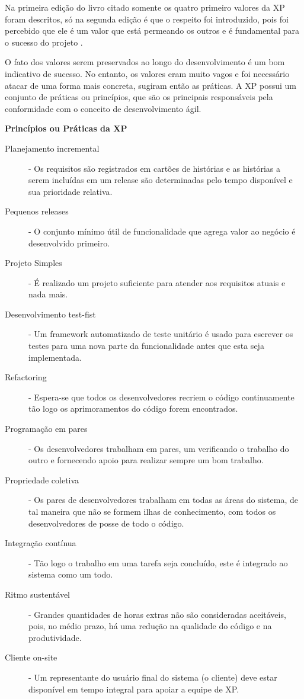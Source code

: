 \documentclass[
	article,			%
	11pt,				%
	oneside,			%
	a4paper,			%
	english,			%
	brazil,				%
	sumario=tradicional
	]{abntex2}
\begin{document}
Na primeira edição do livro citado somente os quatro primeiro valores da XP
foram descritos, só na segunda edição é que o respeito foi introduzido, pois foi
percebido que ele é um valor que está permeando os outros e é fundamental para
o sucesso do projeto \cite{beck2000extreme}.

O fato dos valores serem preservados ao longo do desenvolvimento é um bom
indicativo de sucesso. No entanto, os valores eram muito vagos e foi necessário
atacar de uma forma mais concreta, sugiram então as práticas. A XP possui um
conjunto de práticas ou princípios, que são os principais responsáveis pela
conformidade com o conceito de desenvolvimento ágil.

\textbf{Princípios ou Práticas da XP}

\begin{description}
   \item[Planejamento incremental] - Os requisitos são registrados em cartões de
   histórias e as histórias a serem incluídas em um release são determinadas
   pelo tempo disponível e sua prioridade relativa.
   \item[Pequenos releases] - O conjunto mínimo útil de funcionalidade que
   agrega valor ao negócio é desenvolvido primeiro.
   \item[Projeto Simples] - É realizado um projeto suficiente para atender aos
   requisitos atuais e nada mais.
   \item[Desenvolvimento test-fist] - Um framework automatizado de teste
   unitário é usado para escrever os testes para uma nova parte da
   funcionalidade antes que esta seja implementada.
   \item[Refactoring] - Espera-se que todos os desenvolvedores recriem o código
   continuamente tão logo os aprimoramentos do código forem encontrados.
   \item[Programação em pares] - Os desenvolvedores trabalham em pares, um
   verificando o trabalho do outro e fornecendo apoio para realizar sempre um
   bom trabalho.
   \item[Propriedade coletiva] - Os pares de desenvolvedores trabalham em todas
   as áreas do sistema, de tal maneira que não se formem ilhas de conhecimento,
   com todos os desenvolvedores de posse de todo o código.
   \item[Integração contínua] - Tão logo o trabalho em uma tarefa seja
   concluído, este é integrado ao sistema como um todo.
   \item[Ritmo sustentável] - Grandes quantidades de horas extras não são
   consideradas aceitáveis, pois, no médio prazo, há uma redução na qualidade do
   código e na produtividade.
   \item[Cliente on-site] - Um representante do usuário final do sistema (o
   cliente) deve estar disponível em tempo integral para apoiar a equipe de XP.
\end{description}
\end{document}

